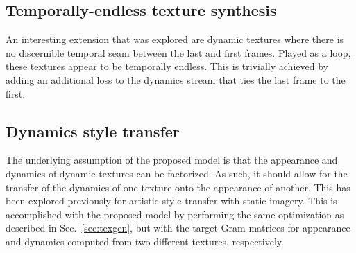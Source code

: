 

\subsection{Temporally-endless texture synthesis}\label{sec:temporally_endless_synthesis}

An interesting extension that was explored are dynamic textures where there is no discernible temporal seam between the last and first frames. Played as a loop, these textures appear to be temporally endless. This is trivially achieved by adding an additional loss to the dynamics stream that ties the last frame to the first. 

\subsection{Dynamics style transfer}

The underlying assumption of the proposed model is that the appearance
and dynamics of dynamic textures can be factorized.
As such, it should allow for the transfer of the dynamics of
one texture onto the appearance of another.
This has been explored previously for artistic style transfer
\cite{champandard2016,gatys2017} with static imagery.
This is accomplished with the proposed model by performing the same 
optimization as described in Sec.\ \ref{sec:texgen}, but with the target Gram matrices for 
appearance and dynamics computed from two different textures, respectively. 